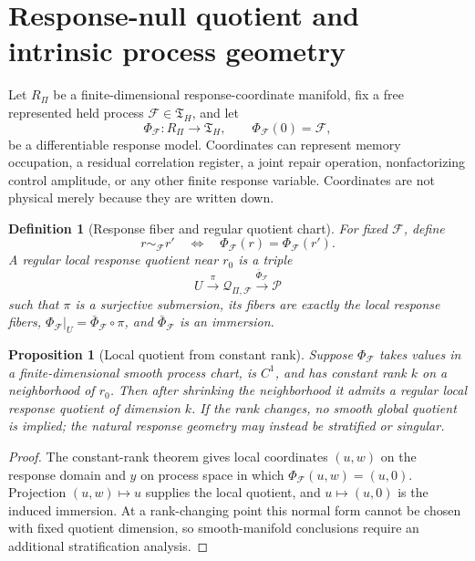 \documentclass[11pt]{article}
\newtheorem{proposition}[theorem]{Proposition}
\newtheorem{definition}[theorem]{Definition}
\theoremstyle{remark}
\newcommand{\Pproc}{\mathcal P}
\newcommand{\Qresp}{\mathcal Q}
\newcommand{\Tproc}{\mathfrak T_H}
\begin{document}
\section{Response-null quotient and intrinsic process geometry}
\label{sec:metric-emergence}

Let $R_\Pi$ be a finite-dimensional response-coordinate manifold, fix a free represented held process $\mathcal F\in\Tproc$, and let
\[
        \Phi_{\mathcal F}:R_\Pi\longrightarrow\Tproc,
        \qquad
        \Phi_{\mathcal F}(0)=\mathcal F,
\]
be a differentiable response model.  Coordinates can represent memory occupation, a residual correlation register, a joint repair operation, nonfactorizing control amplitude, or any other finite response variable.  Coordinates are not physical merely because they are written down.

\begin{definition}[Response fiber and regular quotient chart]
For fixed $\mathcal F$, define
\[
        r\sim_{\mathcal F}r'
        \quad\Longleftrightarrow\quad
        \Phi_{\mathcal F}(r)=\Phi_{\mathcal F}(r').
\]
A regular local response quotient near $r_0$ is a triple
\[
        U\xrightarrow{\pi}\Qresp_{\Pi,\mathcal F}
        \xrightarrow{\bar\Phi_{\mathcal F}}\Pproc
\]
such that $\pi$ is a surjective submersion, its fibers are exactly the local response fibers, $\Phi_{\mathcal F}|_U=\bar\Phi_{\mathcal F}\circ\pi$, and $\bar\Phi_{\mathcal F}$ is an immersion.
\end{definition}

\begin{proposition}[Local quotient from constant rank]
\label{prop:constant-rank-response-quotient}
Suppose $\Phi_{\mathcal F}$ takes values in a finite-dimensional smooth process chart, is $C^1$, and has constant rank $k$ on a neighborhood of $r_0$.  Then after shrinking the neighborhood it admits a regular local response quotient of dimension $k$.  If the rank changes, no smooth global quotient is implied; the natural response geometry may instead be stratified or singular.
\end{proposition}

\begin{proof}
The constant-rank theorem gives local coordinates $(u,w)$ on the response domain and $y$ on process space in which $\Phi_{\mathcal F}(u,w)=(u,0)$.  Projection $(u,w)\mapsto u$ supplies the local quotient, and $u\mapsto(u,0)$ is the induced immersion.  At a rank-changing point this normal form cannot be chosen with fixed quotient dimension, so smooth-manifold conclusions require an additional stratification analysis.
\end{proof}
\end{document}

